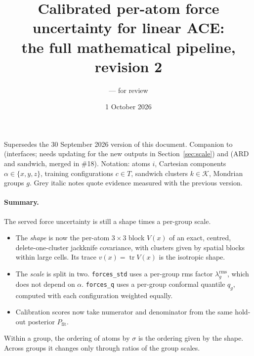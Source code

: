 \documentclass[11pt,a4paper]{article}
\title{Calibrated per-atom force uncertainty for linear ACE:\\
the full mathematical pipeline, revision 2}
\author{\code{ace-jax} \code{feat/conformal-uq} --- for review}
\date{1 October 2026}
\newcommand{\code}[1]{\texttt{#1}}
\begin{document}
\maketitle

\noindent Supersedes the 30 September 2026 version of this document. Companion to
 (interfaces; needs updating for the
new outputs in Section~\ref{sec:scale}) and  (ARD and
sandwich, merged in \#18). Notation: atoms $i$, Cartesian components $\alpha\in\{x,y,z\}$, training
configurations $c\in T$, sandwich clusters $k\in\mathcal{K}$, Mondrian groups $g$. Grey italic notes quote evidence measured with the previous version.

\paragraph{Summary.} The served force uncertainty is still a shape times a per-group scale.
\begin{itemize}[nosep]
  \item The \emph{shape} is now the per-atom $3\times3$ block $V(x)$ of an exact, centred,
  delete-one-cluster jackknife covariance, with clusters given by spatial blocks within large cells.
  Its trace $v(x)=\operatorname{tr}V(x)$ is the isotropic shape.
  \item The \emph{scale} is split in two. \code{forces\_std} uses a per-group rms factor
  $\lambda_g^{\mathrm{rms}}$, which does not depend on $\alpha$. \code{forces\_q} uses a per-group
  conformal quantile $q_g$, computed with each configuration weighted equally.
  \item Calibration scores now take numerator and denominator from the same hold-out posterior
  $P_{\mathrm{fit}}$.
\end{itemize}
Within a group, the ordering of atoms by $\sigma$ is the ordering given by the shape. Across groups
it changes only through ratios of the group scales.
\end{document}

